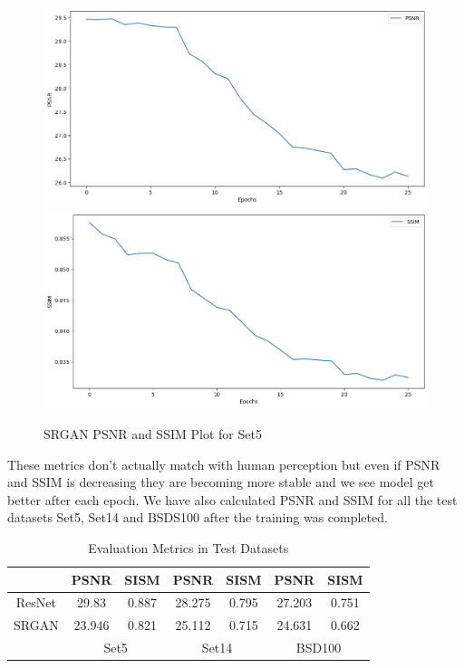 \begin{figure}[h]
    \centering
    \includegraphics[width=5.5in]{./figures/srgan_psnr.png}
    \includegraphics[width=5.5in]{./figures/srgan_ssim.png}
    \caption{SRGAN PSNR and SSIM Plot for Set5}
\end{figure}  
    These metrics don't actually match with human perception but even if PSNR and SSIM is decreasing they are becoming more stable and we see model get better after each epoch.
    We have also calculated PSNR and SSIM for all the test datasets Set5, Set14 and BSDS100 after the training was completed.
\begin{table}[h]
    \centering
    \begin{tabular}{|c|c|c|c|c|c|c|}
    \hline
    &PSNR & SISM & PSNR & SISM & PSNR & SISM \\
    \hline
    ResNet&29.83 & 0.887 & 28.275 & 0.795 & 27.203 & 0.751 \\
    \hline
    SRGAN &23.946 & 0.821 &25.112 & 0.715 & 24.631 & 0.662 \\
    \hline
    & \multicolumn{2}{|c|}{Set5}& \multicolumn{2}{|c|}{Set14} & \multicolumn{2}{|c|}{BSD100} \\
    \hline
    \end{tabular}
    \caption{Evaluation Metrics in Test Datasets}
\end{table}
